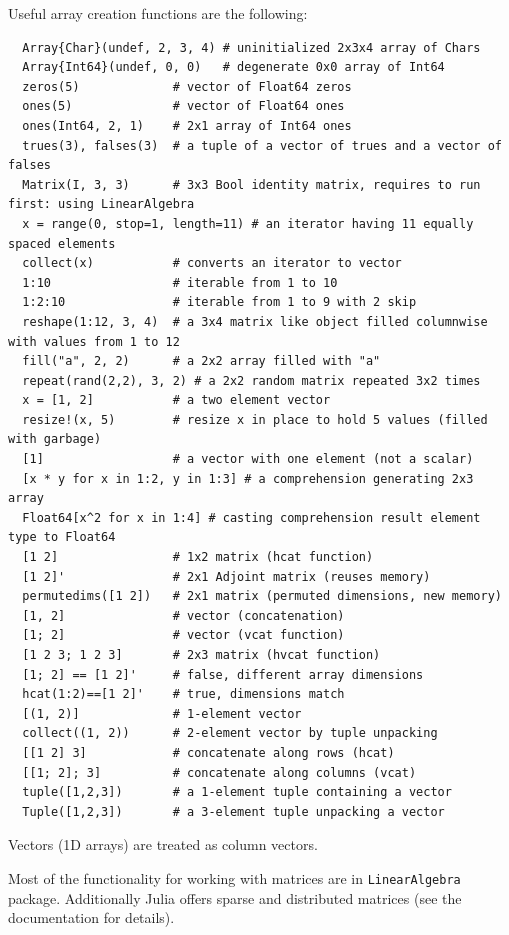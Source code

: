 \documentclass[10pt,a4paper]{article}
\begin{document}
Useful array creation functions are the following:
\begin{lstlisting}
  Array{Char}(undef, 2, 3, 4) # uninitialized 2x3x4 array of Chars
  Array{Int64}(undef, 0, 0)   # degenerate 0x0 array of Int64
  zeros(5)             # vector of Float64 zeros
  ones(5)              # vector of Float64 ones
  ones(Int64, 2, 1)    # 2x1 array of Int64 ones
  trues(3), falses(3)  # a tuple of a vector of trues and a vector of falses
  Matrix(I, 3, 3)      # 3x3 Bool identity matrix, requires to run first: using LinearAlgebra
  x = range(0, stop=1, length=11) # an iterator having 11 equally spaced elements
  collect(x)           # converts an iterator to vector
  1:10                 # iterable from 1 to 10
  1:2:10               # iterable from 1 to 9 with 2 skip
  reshape(1:12, 3, 4)  # a 3x4 matrix like object filled columnwise with values from 1 to 12
  fill("a", 2, 2)      # a 2x2 array filled with "a"
  repeat(rand(2,2), 3, 2) # a 2x2 random matrix repeated 3x2 times
  x = [1, 2]           # a two element vector
  resize!(x, 5)        # resize x in place to hold 5 values (filled with garbage)
  [1]                  # a vector with one element (not a scalar)
  [x * y for x in 1:2, y in 1:3] # a comprehension generating 2x3 array
  Float64[x^2 for x in 1:4] # casting comprehension result element type to Float64
  [1 2]                # 1x2 matrix (hcat function)
  [1 2]'               # 2x1 Adjoint matrix (reuses memory)
  permutedims([1 2])   # 2x1 matrix (permuted dimensions, new memory)
  [1, 2]               # vector (concatenation)
  [1; 2]               # vector (vcat function)
  [1 2 3; 1 2 3]       # 2x3 matrix (hvcat function)
  [1; 2] == [1 2]'     # false, different array dimensions
  hcat(1:2)==[1 2]'    # true, dimensions match
  [(1, 2)]             # 1-element vector
  collect((1, 2))      # 2-element vector by tuple unpacking
  [[1 2] 3]            # concatenate along rows (hcat)
  [[1; 2]; 3]          # concatenate along columns (vcat)
  tuple([1,2,3])       # a 1-element tuple containing a vector
  Tuple([1,2,3])       # a 3-element tuple unpacking a vector
\end{lstlisting}
Vectors (1D arrays) are treated as column vectors.

Most of the functionality for working with matrices are in \lstinline|LinearAlgebra| package.
Additionally Julia offers sparse and distributed matrices (see the documentation for details).
\end{document}
